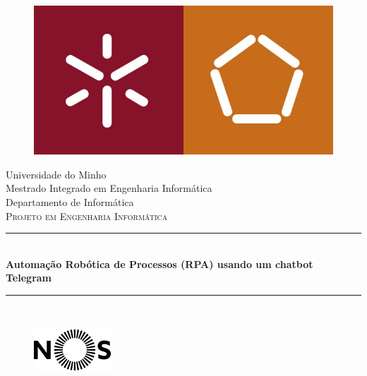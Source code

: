\documentclass[11pt,a4paper]{article}
\begin{document}
\setcounter{tocdepth}{4}
\setcounter{secnumdepth}{4}
\begin{titlepage}

\newcommand{\HRule}{\rule{\linewidth}{0.5mm}} %

\center %

\begin{figure}[H]
    \centering
    \includegraphics[scale=0.5]{images/UM_EENG.jpg}
    \label{figUM}
\end{figure}

\large Universidade do Minho\\[0.2cm] %
\large Mestrado Integrado em Engenharia Informática\\[0.2cm] %
\large Departamento de Informática\\[2.5cm] %

\textsc{\Large Projeto em Engenharia Informática}\\[0.3cm] %
\HRule \\[0.3cm]
{ \LARGE \bfseries Automação Robótica de Processos (RPA) usando um chatbot Telegram}\\[0.3cm] %
\HRule \\[0.3cm]

\begin{figure}[H]
    \centering
    \includegraphics[scale=0.6]{images/nos.png}
    \label{figNOS}
\end{figure}



\end{titlepage}
\end{document}
